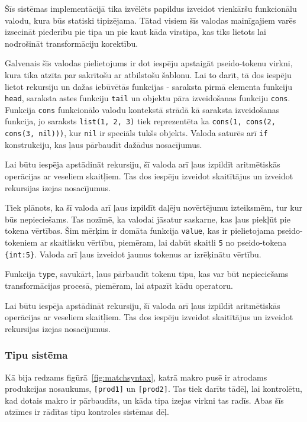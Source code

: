 Šīs sistēmas implementācijā tika izvēlēts papildus izveidot vienkāršu funkcionālu valodu, kura būs statiski tipizējama. Tātad visiem šīs valodas mainīgajiem varēs izsecināt piederību pie tipa un pie kaut kāda virstipa, kas tiks lietots lai nodrošināt transformāciju korektību.

Galvenais šīs valodas pielietojums ir dot iespēju apstaigāt pseido-tokenu virkni, kura tika atzīta par sakrītošu ar atbilstošu šablonu. Lai to darīt, tā dos iespēju lietot rekursiju un dažas iebūvētās funkcijas - saraksta pirmā elementa funkciju \verb|head|, saraksta astes funkciju \verb|tail| un objektu pāra izveidošanas funkciju \verb|cons|. Funkcija \verb|cons| funkcionālo valodu kontekstā strādā kā saraksta izveidošanas funkcija, jo saraksts \verb|list(1, 2, 3)| tiek reprezentēta ka \verb|cons(1, cons(2, cons(3, nil)))|, kur \verb|nil| ir speciāls tukšs objekts. Valoda saturēs arī \verb|if| konstrukciju, kas ļaus pārbaudīt dažādus nosacījumus.

Lai būtu iespēja apstādināt rekursiju, šī valoda arī ļaus izpildīt aritmētiskās operācijas ar veseliem skaitļiem. Tas dos iespēju izveidot skaitītājus un izveidot rekursijas izejas nosacījumus.

Tiek plānots, ka šī valoda arī ļaus izpildīt daļēju novērtējumu izteiksmēm, tur kur būs nepieciešams. Tas nozīmē, ka valodai jāsatur saskarne, kas ļaus piekļūt pie tokena vērtības. Šim mērķim ir domāta funkcija \verb|value|, kas ir pielietojama pseido-tokeniem ar skaitlisku vērtību, piemēram, lai dabūt skaitli \verb|5| no pseido-tokena \verb|{int:5}|. Valoda arī ļaus izveidot jaunus tokenus ar izrēķinātu vērtību.

Funkcija \verb|type|, savukārt, ļaus pārbaudīt tokenu tipu, kas var būt nepieciešams transformācijas procesā, piemēram, lai atpazīt kādu operatoru.

Lai būtu iespēja apstādināt rekursiju, šī valoda arī ļaus izpildīt aritmētiskās operācijas ar veseliem skaitļiem. Tas dos iespēju izveidot skaitītājus un izveidot rekursijas izejas nosacījumus.

\subsubsection{\label{syste_typesystem}Tipu sistēma}

Kā bija redzams figūrā~\ref{fig:matchsyntax}, katrā makro pusē ir atrodams produkcijas nosaukums, \verb|[prod1]| un \verb|[prod2]|. Tas tiek darīts tādēļ, lai kontrolētu, kad dotais makro ir pārbaudīts, un kāda tipa izejas virkni tas radīs. Abas šīs atzīmes ir rādītas tipu kontroles sistēmas dēļ.

